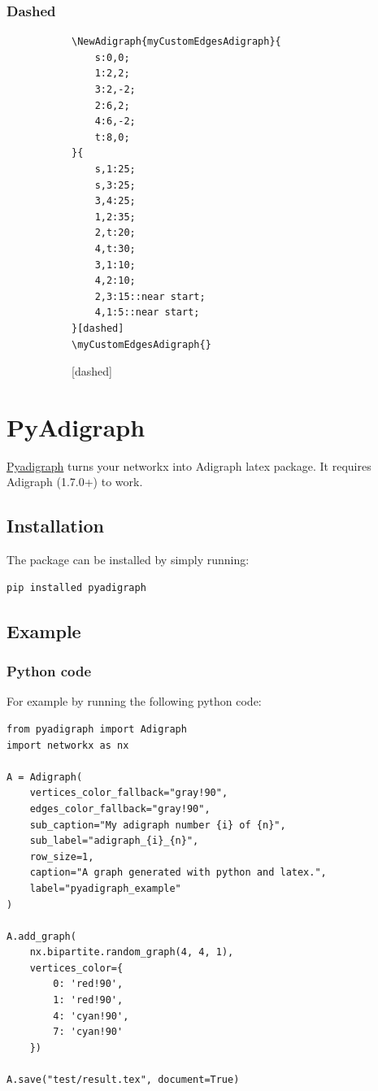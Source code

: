 \documentclass{report}
\begin{document}
\subsection{Dashed}
\begin{figure}
	\begin{subfigure}{0.49\textwidth}
		\begin{verbatim}
\NewAdigraph{myCustomEdgesAdigraph}{
	s:0,0;
	1:2,2;
	3:2,-2;
	2:6,2;
	4:6,-2;
	t:8,0;
}{
	s,1:25;
	s,3:25;
	3,4:25;
	1,2:35;
	2,t:20;
	4,t:30;
	3,1:10;
	4,2:10;
	2,3:15::near start;
	4,1:5::near start;
}[dashed]
\myCustomEdgesAdigraph{}
\end{verbatim}
	\end{subfigure}
	\begin{subfigure}{0.49\textwidth}
		[dashed]
		\myCustomEdgesAdigraph{}
	\end{subfigure}
\end{figure}

\chapter{PyAdigraph}
\href{https://github.com/LucaCappelletti94/pyadigraph}{Pyadigraph} turns your networkx into Adigraph latex package. It requires Adigraph (1.7.0+) to work.

\section{Installation}
The package can be installed by simply running:
\begin{verbatim}
pip installed pyadigraph
\end{verbatim}
\clearpage
\section{Example}
\subsection{Python code}
For example by running the following python code:
\begin{verbatim}
from pyadigraph import Adigraph
import networkx as nx

A = Adigraph(
    vertices_color_fallback="gray!90",
    edges_color_fallback="gray!90",
    sub_caption="My adigraph number {i} of {n}",
    sub_label="adigraph_{i}_{n}",
    row_size=1,
    caption="A graph generated with python and latex.",
    label="pyadigraph_example"
)

A.add_graph(
    nx.bipartite.random_graph(4, 4, 1),
    vertices_color={
        0: 'red!90',
        1: 'red!90',
        4: 'cyan!90',
        7: 'cyan!90'
    })

A.save("test/result.tex", document=True)
\end{verbatim}
\clearpage
\end{document}
